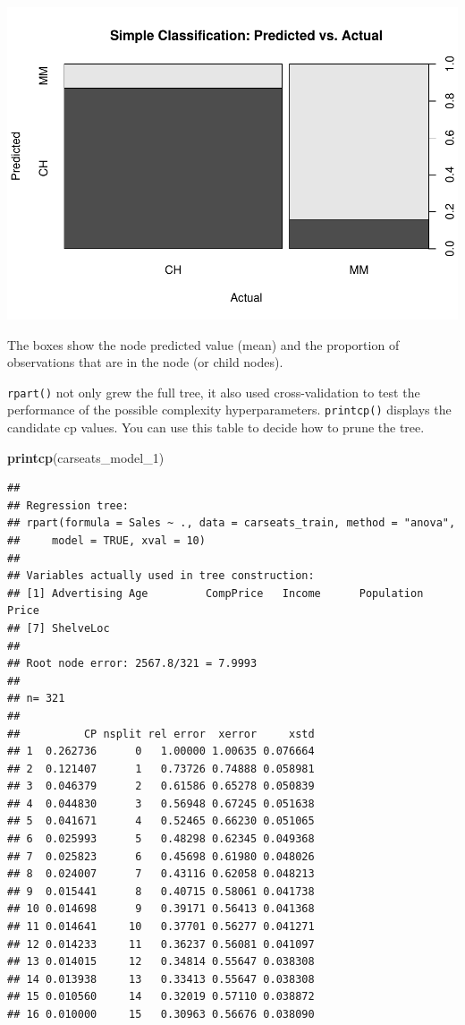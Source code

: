 \documentclass[]{book}
\newenvironment{Shaded}{\begin{snugshade}}{\end{snugshade}}
\newcommand{\DecValTok}[1]{\textcolor[rgb]{0.00,0.00,0.81}{#1}}
\newcommand{\KeywordTok}[1]{\textcolor[rgb]{0.13,0.29,0.53}{\textbf{#1}}}
\newcommand{\NormalTok}[1]{#1}
\begin{document}
\includegraphics{data-sci_files/figure-latex/unnamed-chunk-62-1.pdf}

The boxes show the node predicted value (mean) and the proportion of observations that are in the node (or child nodes).

\texttt{rpart()} not only grew the full tree, it also used cross-validation to test the performance of the possible complexity hyperparameters. \texttt{printcp()} displays the candidate cp values. You can use this table to decide how to prune the tree.

\begin{Shaded}
\begin{Highlighting}[]
\KeywordTok{printcp}\NormalTok{(carseats_model_}\DecValTok{1}\NormalTok{)}
\end{Highlighting}
\end{Shaded}

\begin{verbatim}
## 
## Regression tree:
## rpart(formula = Sales ~ ., data = carseats_train, method = "anova", 
##     model = TRUE, xval = 10)
## 
## Variables actually used in tree construction:
## [1] Advertising Age         CompPrice   Income      Population  Price      
## [7] ShelveLoc  
## 
## Root node error: 2567.8/321 = 7.9993
## 
## n= 321 
## 
##          CP nsplit rel error  xerror     xstd
## 1  0.262736      0   1.00000 1.00635 0.076664
## 2  0.121407      1   0.73726 0.74888 0.058981
## 3  0.046379      2   0.61586 0.65278 0.050839
## 4  0.044830      3   0.56948 0.67245 0.051638
## 5  0.041671      4   0.52465 0.66230 0.051065
## 6  0.025993      5   0.48298 0.62345 0.049368
## 7  0.025823      6   0.45698 0.61980 0.048026
## 8  0.024007      7   0.43116 0.62058 0.048213
## 9  0.015441      8   0.40715 0.58061 0.041738
## 10 0.014698      9   0.39171 0.56413 0.041368
## 11 0.014641     10   0.37701 0.56277 0.041271
## 12 0.014233     11   0.36237 0.56081 0.041097
## 13 0.014015     12   0.34814 0.55647 0.038308
## 14 0.013938     13   0.33413 0.55647 0.038308
## 15 0.010560     14   0.32019 0.57110 0.038872
## 16 0.010000     15   0.30963 0.56676 0.038090
\end{verbatim}
\end{document}
